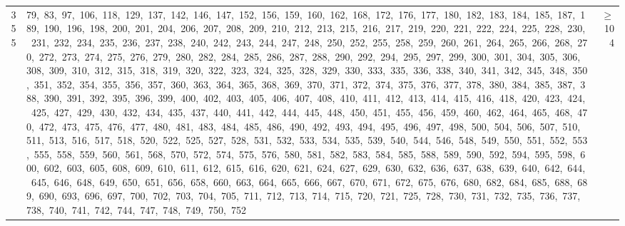 \begin{longtable}{c|p{}|r}
355 & 79,\ 83,\ 97,\ 106,\ 118,\ 129,\ 137,\ 142,\ 146,\ 147,\ 152,\ 156,\ 159,\ 160,\ 162,\ 168,\ 172,\ 176,\ 177,\ 180,\ 182,\ 183,\ 184,\ 185,\ 187,\ 189,\ 190,\ 196,\ 198,\ 200,\ 201,\ 204,\ 206,\ 207,\ 208,\ 209,\ 210,\ 212,\ 213,\ 215,\ 216,\ 217,\ 219,\ 220,\ 221,\ 222,\ 224,\ 225,\ 228,\ 230,\ 231,\ 232,\ 234,\ 235,\ 236,\ 237,\ 238,\ 240,\ 242,\ 243,\ 244,\ 247,\ 248,\ 250,\ 252,\ 255,\ 258,\ 259,\ 260,\ 261,\ 264,\ 265,\ 266,\ 268,\ 270,\ 272,\ 273,\ 274,\ 275,\ 276,\ 279,\ 280,\ 282,\ 284,\ 285,\ 286,\ 287,\ 288,\ 290,\ 292,\ 294,\ 295,\ 297,\ 299,\ 300,\ 301,\ 304,\ 305,\ 306,\ 308,\ 309,\ 310,\ 312,\ 315,\ 318,\ 319,\ 320,\ 322,\ 323,\ 324,\ 325,\ 328,\ 329,\ 330,\ 333,\ 335,\ 336,\ 338,\ 340,\ 341,\ 342,\ 345,\ 348,\ 350,\ 351,\ 352,\ 354,\ 355,\ 356,\ 357,\ 360,\ 363,\ 364,\ 365,\ 368,\ 369,\ 370,\ 371,\ 372,\ 374,\ 375,\ 376,\ 377,\ 378,\ 380,\ 384,\ 385,\ 387,\ 388,\ 390,\ 391,\ 392,\ 395,\ 396,\ 399,\ 400,\ 402,\ 403,\ 405,\ 406,\ 407,\ 408,\ 410,\ 411,\ 412,\ 413,\ 414,\ 415,\ 416,\ 418,\ 420,\ 423,\ 424,\ 425,\ 427,\ 429,\ 430,\ 432,\ 434,\ 435,\ 437,\ 440,\ 441,\ 442,\ 444,\ 445,\ 448,\ 450,\ 451,\ 455,\ 456,\ 459,\ 460,\ 462,\ 464,\ 465,\ 468,\ 470,\ 472,\ 473,\ 475,\ 476,\ 477,\ 480,\ 481,\ 483,\ 484,\ 485,\ 486,\ 490,\ 492,\ 493,\ 494,\ 495,\ 496,\ 497,\ 498,\ 500,\ 504,\ 506,\ 507,\ 510,\ 511,\ 513,\ 516,\ 517,\ 518,\ 520,\ 522,\ 525,\ 527,\ 528,\ 531,\ 532,\ 533,\ 534,\ 535,\ 539,\ 540,\ 544,\ 546,\ 548,\ 549,\ 550,\ 551,\ 552,\ 553,\ 555,\ 558,\ 559,\ 560,\ 561,\ 568,\ 570,\ 572,\ 574,\ 575,\ 576,\ 580,\ 581,\ 582,\ 583,\ 584,\ 585,\ 588,\ 589,\ 590,\ 592,\ 594,\ 595,\ 598,\ 600,\ 602,\ 603,\ 605,\ 608,\ 609,\ 610,\ 611,\ 612,\ 615,\ 616,\ 620,\ 621,\ 624,\ 627,\ 629,\ 630,\ 632,\ 636,\ 637,\ 638,\ 639,\ 640,\ 642,\ 644,\ 645,\ 646,\ 648,\ 649,\ 650,\ 651,\ 656,\ 658,\ 660,\ 663,\ 664,\ 665,\ 666,\ 667,\ 670,\ 671,\ 672,\ 675,\ 676,\ 680,\ 682,\ 684,\ 685,\ 688,\ 689,\ 690,\ 693,\ 696,\ 697,\ 700,\ 702,\ 703,\ 704,\ 705,\ 711,\ 712,\ 713,\ 714,\ 715,\ 720,\ 721,\ 725,\ 728,\ 730,\ 731,\ 732,\ 735,\ 736,\ 737,\ 738,\ 740,\ 741,\ 742,\ 744,\ 747,\ 748,\ 749,\ 750,\ 752 & $\ge$ 104 \\

\end{longtable}
